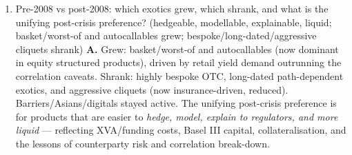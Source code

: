 \documentclass[
  11pt,
]{article}
\begin{document}
\begin{enumerate}
  volatility and forward skew prevailing then, not today's spot-starting
  smile --- an exposure no vanilla portfolio (all spot-starting) can
  replicate. So pricing is highly sensitive to smile \emph{dynamics};
  the practical method is MC with a local/stochastic-vol (or hybrid)
  model that gets the forward skew right, since the reset features
  combine trivially with such models.
\item
  Pre-2008 vs post-2008: which exotics grew, which shrank, and what is
  the unifying post-crisis preference? (hedgeable, modellable,
  explainable, liquid; basket/worst-of and autocallables grew;
  bespoke/long-dated/aggressive cliquets shrank) \textbf{A.} Grew:
  basket/worst-of and autocallables (now dominant in equity structured
  products), driven by retail yield demand outrunning the correlation
  caveats. Shrank: highly bespoke OTC, long-dated path-dependent
  exotics, and aggressive cliquets (now insurance-driven, reduced).
  Barriers/Asians/digitals stayed active. The unifying post-crisis
  preference is for products that are easier to \emph{hedge, model,
  explain to regulators, and more liquid} --- reflecting XVA/funding
  costs, Basel III capital, collateralisation, and the lessons of
  counterparty risk and correlation break-down.
\end{enumerate}
\end{document}
